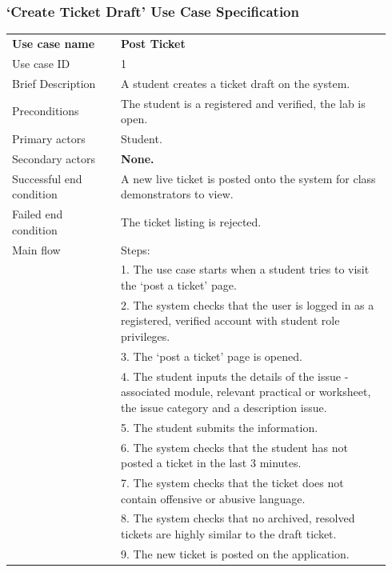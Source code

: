 \documentclass[a4paper,11pt]{article}
\begin{document}
\subsubsection*{`Create Ticket Draft' Use Case Specification}
\begin{table}[H]
\centering
 \begin{tabular}{p{0.27\linewidth}  p{0.67\linewidth}}
 \textbf{Use case name} & \textbf{Post Ticket}  \\
 Use case ID & 1\\
 Brief Description & A student creates a ticket draft on the system.\\
 Preconditions & The student is a registered and verified, the lab is open.\\
 Primary actors & Student. \\
 Secondary actors & \textbf{None.} \\
 Successful end condition & A new live ticket is posted onto the system for class demonstrators to view. \\
 Failed end condition & The ticket listing is rejected. \\
 Main flow & Steps:\\
 & 1. The use case starts when a student tries to visit the `post a ticket' page.\\
 & 2. The system checks that the user is logged in as a registered, verified account with student role privileges. \\
 & 3. The `post a ticket' page is opened. \\
 & 4. The student inputs the details of the issue - associated module, relevant practical or worksheet, the issue category and a description issue.\\
 & 5. The student submits the information. \\
 & 6. The system checks that the student has not posted a ticket in the last 3 minutes. \\
 & 7. The system checks that the ticket does not contain offensive or abusive language. \\
 & 8. The system checks that no archived, resolved tickets are highly similar to the draft ticket.\\
 & 9. The new ticket is posted on the application.\\


\end{tabular}
\end{table}
\end{document}
